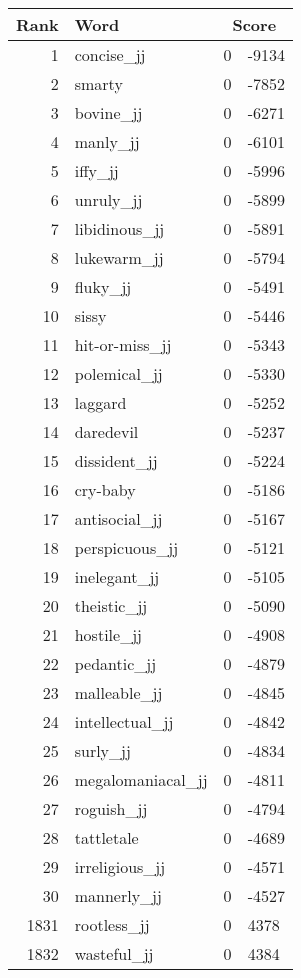 \begin{longtable}[!htbp]{| rlr@{.}l |}
    \hline
    \textbf{Rank} & \textbf{Word} & \multicolumn{2}{c|}{\textbf{Score}} \\
    \hline
    \endhead
    1 & concise\_jj & 0 & -9134 \\
    2 & smarty & 0 & -7852 \\
    3 & bovine\_jj & 0 & -6271 \\
    4 & manly\_jj & 0 & -6101 \\
    5 & iffy\_jj & 0 & -5996 \\
    6 & unruly\_jj & 0 & -5899 \\
    7 & libidinous\_jj & 0 & -5891 \\
    8 & lukewarm\_jj & 0 & -5794 \\
    9 & fluky\_jj & 0 & -5491 \\
    10 & sissy & 0 & -5446 \\
    11 & hit-or-miss\_jj & 0 & -5343 \\
    12 & polemical\_jj & 0 & -5330 \\
    13 & laggard & 0 & -5252 \\
    14 & daredevil & 0 & -5237 \\
    15 & dissident\_jj & 0 & -5224 \\
    16 & cry-baby & 0 & -5186 \\
    17 & antisocial\_jj & 0 & -5167 \\
    18 & perspicuous\_jj & 0 & -5121 \\
    19 & inelegant\_jj & 0 & -5105 \\
    20 & theistic\_jj & 0 & -5090 \\
    21 & hostile\_jj & 0 & -4908 \\
    22 & pedantic\_jj & 0 & -4879 \\
    23 & malleable\_jj & 0 & -4845 \\
    24 & intellectual\_jj & 0 & -4842 \\
    25 & surly\_jj & 0 & -4834 \\
    26 & megalomaniacal\_jj & 0 & -4811 \\
    27 & roguish\_jj & 0 & -4794 \\
    28 & tattletale & 0 & -4689 \\
    29 & irreligious\_jj & 0 & -4571 \\
    30 & mannerly\_jj & 0 & -4527 \\
    1831 & rootless\_jj & 0 & 4378 \\
    1832 & wasteful\_jj & 0 & 4384 \\

\end{longtable}
